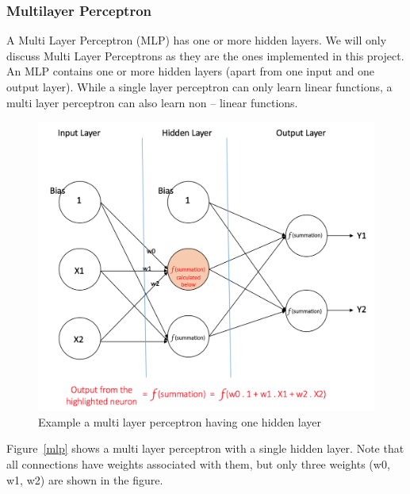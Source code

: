 \documentclass{article}
\begin{document}
\subsubsection{Multilayer Perceptron}

A Multi Layer Perceptron (MLP) has one or more hidden layers. We will only discuss Multi Layer Perceptrons as they are the ones implemented in this project. An MLP contains one or more hidden layers (apart from one input and one output layer).  While a single layer perceptron can only learn linear functions, a multi layer perceptron can also learn non – linear functions.

\begin{figure}[!h]
	\centering
		\includegraphics[width=\columnwidth]{images/mlp.png}
		\caption{Example a multi layer perceptron having one hidden layer}\label{mlp}
	\label{fig:graph}
\end{figure}

Figure~\ref{mlp} shows a multi layer perceptron with a single hidden layer. Note that all connections have weights associated with them, but only three weights (w0, w1, w2) are shown in the figure.
\end{document}
